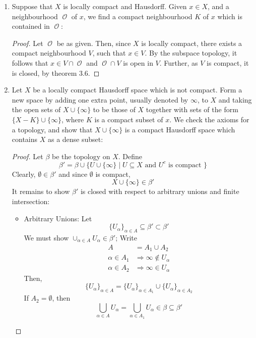 \documentclass{book}
\DeclareMathOperator*{\Ocal}{\mathcal{O}}
\begin{document}
\begin{enumerate}[(1)]
    \item Suppose that $X$ is locally compact and Hausdorff. Given $x \in X$, and a neighbourhood $\Ocal$ of $x$, we find a compact neighbourhood $K$ of $x$ which is contained in $\Ocal$:  
        \begin{proof} Let $\Ocal$ be as given. Then, since $X$ is locally compact, there exists a compact neighbourhood $V$, such that $x \in V$. By the subspace topology, it follows that $x \in V \cap \Ocal$ and $\Ocal \cap V$ is open in $V$. Further, as $V$ is compact, it is closed, by theorem 3.6. 
        \end{proof}

    \item Let $X$ be a locally compact Hausdorff space which is not compact.  Form a new space by adding one extra point, usually denoted by $\infty$, to $X$ and taking the open sets of $X\cup\{\infty\}$ to be those of $X$ together with sets of the form $\{X-K\}\cup\{\infty\}$, where $K$ is a compact subset of $x$.  We check the axioms for a topology, and show that $X\cup\{\infty\}$ is a compact Hausdorff space which contains $X$ as a dense subset: 
        \begin{proof}  Let $\beta$ be the topology on $X$.  Define 
            \[\beta'=\beta\cup\{U\cup\{\infty\}\mid U\subseteq X\text{ and }U^c\text{ is compact }\}\]
            Clearly, $\emptyset\in\beta'$ and since $\emptyset$ is compact, 
            \[ X \cup \{\infty\}\in\beta'\]
            It remains to show $\beta'$ is closed with respect to arbitrary unions and finite intersection: 
            \begin{itemize}
                \item Arbitrary Unions: Let 
                    \[ \{U_\alpha\}_{\alpha\in A}\subseteq\beta' \subset \beta'\] 
                    We must show $\cup_{\alpha\in A}U_\alpha\in \beta'$;
                    Write 
                    \begin{align*}
                        A & = A_1\cup A_2 \\
                        \alpha\in A_1 & \Rightarrow \infty\not\in U_\alpha \\ 
                        \alpha\in A_2 & \Rightarrow \infty\in U_\alpha
                    \end{align*}  
                    Then, 
                    \[\{U_\alpha\}_{\alpha\in A}=\{U_\alpha\}_{\alpha\in A_1}\cup\{U_\alpha\}_{\alpha\in A_2}\]
                    If $A_2=\emptyset$, then 
                    \[\bigcup_{\alpha\in A} U_\alpha=\bigcup_{\alpha\in A_1} U_\alpha\in\beta\subseteq\beta'\]  

\end{itemize}
\end{proof}
\end{enumerate}
\end{document}
